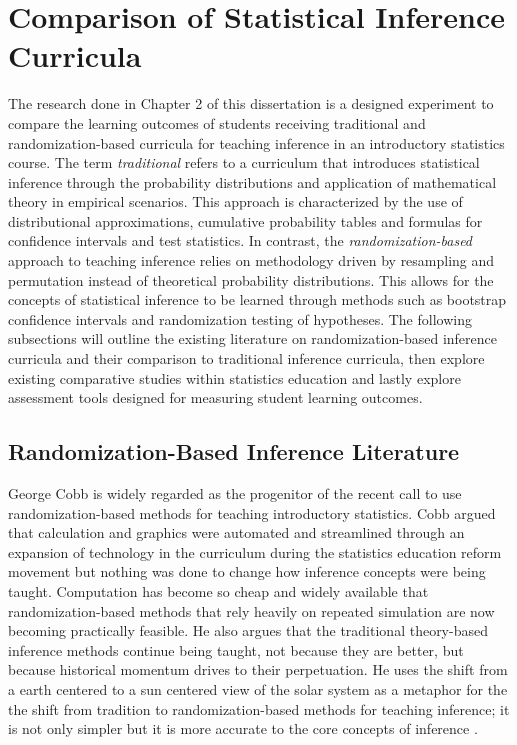 
\section{Comparison of Statistical Inference Curricula} 

The research done in Chapter 2 of this dissertation is a designed experiment to compare the learning outcomes of students receiving traditional and randomization-based curricula for teaching inference in an introductory statistics course.  The term \textit{traditional} refers to a curriculum that introduces statistical inference through the probability distributions and application of mathematical theory in empirical scenarios. This approach is characterized by the use of distributional approximations, cumulative probability tables and formulas for confidence intervals and test statistics. In contrast, the \textit{randomization-based} approach to teaching inference relies on methodology driven by resampling and permutation instead of theoretical probability distributions. This allows for the concepts of statistical inference to be learned through methods such as bootstrap confidence intervals and randomization testing of hypotheses. The following subsections will outline the existing literature on randomization-based inference curricula and their comparison to traditional inference curricula, then explore existing comparative studies within statistics education and lastly explore assessment tools designed for measuring student learning outcomes.


\subsection{Randomization-Based Inference Literature} 

George Cobb is widely regarded as the progenitor of the recent call to use randomization-based methods for teaching introductory statistics. Cobb argued that calculation and graphics were automated and streamlined through an expansion of technology in the curriculum during the statistics education reform movement but nothing was done to change how inference concepts were being taught. Computation has become so cheap and widely available that randomization-based methods that rely heavily on repeated simulation are now becoming practically feasible. He also argues that the traditional theory-based inference methods continue being taught, not because they are better, but because historical momentum drives to their perpetuation. He uses the shift from a earth centered to a sun centered view of the solar system as a metaphor for the the shift from tradition to randomization-based methods for teaching inference; it is not only simpler but it is more accurate to the core concepts of inference \citep{Cobb2007}.

